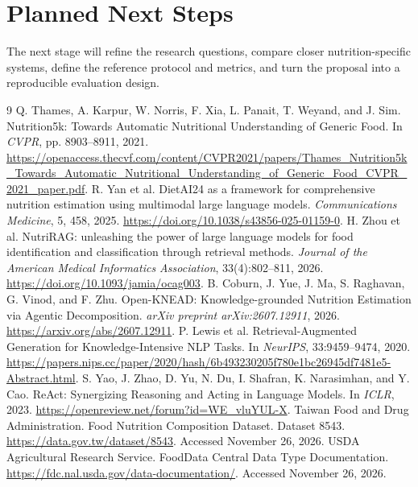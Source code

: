 \documentclass[11pt,a4paper]{article}
\begin{document}
\section{Planned Next Steps}
The next stage will refine the research questions, compare closer nutrition-specific systems, define the reference protocol and metrics, and turn the proposal into a reproducible evaluation design.
\begingroup\small\setlength{\parskip}{0pt}\begin{thebibliography}{9}\setlength{\itemsep}{2pt}
 Q. Thames, A. Karpur, W. Norris, F. Xia, L. Panait, T. Weyand, and J. Sim.
Nutrition5k: Towards Automatic Nutritional Understanding of Generic Food.
In \emph{CVPR}, pp. 8903--8911, 2021.
\url{https://openaccess.thecvf.com/content/CVPR2021/papers/Thames_Nutrition5k_Towards_Automatic_Nutritional_Understanding_of_Generic_Food_CVPR_2021_paper.pdf}.
 R. Yan et al.
DietAI24 as a framework for comprehensive nutrition estimation using multimodal large language models.
\emph{Communications Medicine}, 5, 458, 2025.
\url{https://doi.org/10.1038/s43856-025-01159-0}.
 H. Zhou et al.
NutriRAG: unleashing the power of large language models for food identification and classification through retrieval methods.
\emph{Journal of the American Medical Informatics Association}, 33(4):802--811, 2026.
\url{https://doi.org/10.1093/jamia/ocag003}.
 B. Coburn, J. Yue, J. Ma, S. Raghavan, G. Vinod, and F. Zhu.
Open-KNEAD: Knowledge-grounded Nutrition Estimation via Agentic Decomposition.
\emph{arXiv preprint arXiv:2607.12911}, 2026.
\url{https://arxiv.org/abs/2607.12911}.
 P. Lewis et al.
Retrieval-Augmented Generation for Knowledge-Intensive NLP Tasks.
In \emph{NeurIPS}, 33:9459--9474, 2020.
\url{https://papers.nips.cc/paper/2020/hash/6b493230205f780e1bc26945df7481e5-Abstract.html}.
 S. Yao, J. Zhao, D. Yu, N. Du, I. Shafran, K. Narasimhan, and Y. Cao.
ReAct: Synergizing Reasoning and Acting in Language Models.
In \emph{ICLR}, 2023.
\url{https://openreview.net/forum?id=WE_vluYUL-X}.
 Taiwan Food and Drug Administration.
Food Nutrition Composition Dataset. Dataset 8543.
\url{https://data.gov.tw/dataset/8543}. Accessed November 26, 2026.
 USDA Agricultural Research Service.
FoodData Central Data Type Documentation.
\url{https://fdc.nal.usda.gov/data-documentation/}. Accessed November 26, 2026.
\end{thebibliography}\endgroup
\end{document}
